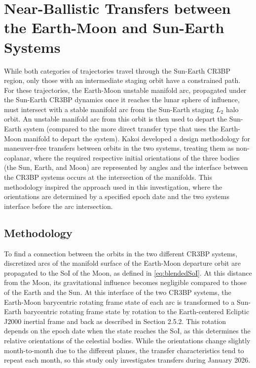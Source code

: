 \section{Near-Ballistic Transfers between the Earth-Moon and Sun-Earth Systems}
While both categories of trajectories travel through the Sun-Earth CR3BP region, only those with an
intermediate staging orbit have a constrained path. For these trajectories, the Earth-Moon unstable
manifold arc, propagated under the Sun-Earth CR3BP dynamics once it reaches the lunar sphere of
influence, must intersect with a stable manifold arc from the Sun-Earth staging $L_{2}$ halo orbit.
An unstable manifold arc from this orbit is then used to depart the Sun-Earth system (compared to
the more direct transfer type that uses the Earth-Moon manifold to depart the system). Kakoi
developed a design methodology for maneuver-free transfers between orbits in the two systems,
treating them as non-coplanar, where the required respective initial orientations of the three
bodies (the Sun, Earth, and Moon) are represented by angles and the interface between the CR3BP
systems occurs at the intersection of the manifolds\cite{Kakoi:2014,Kakoi:2015}. This methodology
inspired the approach used in this investigation, where the orientations are determined by a
specified epoch date and the two systems interface before the arc intersection.

\subsection{Methodology}
To find a connection between the orbits in the two different CR3BP systems, discretized arcs of the
manifold surface of the Earth-Moon departure orbit are propagated to the SoI of the Moon, as
defined in \cref{eq:blendedSoI}. At this distance from the Moon, its gravitational influence
becomes negligible compared to those of the Earth and the Sun. At this interface of the two CR3BP
systems, the Earth-Moon barycentric rotating frame state of each arc is transformed to a Sun-Earth
barycentric rotating frame state by rotation to the Earth-centered Ecliptic J2000 inertial frame
and back as described in Section 2.5.2. This rotation depends on the epoch date when the state
reaches the SoI, as this determines the relative orientations of the celestial bodies. While the
orientations change slightly month-to-month due to the different planes, the transfer
characteristics tend to repeat each month, so this study only investigates transfers during January
2026\cite{Parker:2013}.


